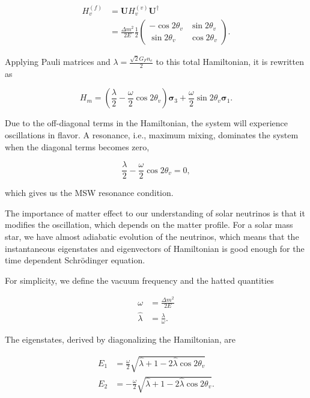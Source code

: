 \documentclass[%
 aip,
 jmp,%
 amsmath,amssymb,
 reprint,%
]{revtex4-1}
\begin{document}
\begin{align}
H_v^{(f)}& = \mathbf{U} H_v^{(v)}\mathbf{U^\dagger} \\
&= \frac{ \Delta m^2 }{2E}\frac{1}{2}\begin{pmatrix} -\cos 2\theta_v & \sin 2 \theta_v \\ \sin 2\theta_v & \cos 2\theta_v  \end{pmatrix}.
\end{align}

Applying Pauli matrices and $\lambda = \frac{\sqrt{2}G_F n_e}{2}$ to this total Hamiltonian, it is rewritten as

\begin{equation}
H_m = \left(\frac{\lambda}{2} -\frac{ \omega }{2} \cos 2\theta_v \right) \boldsymbol{\sigma}_3  + \frac{ \omega }{2} \sin 2\theta_v \boldsymbol{\sigma}_1.
\end{equation}

Due to the off-diagonal terms in the Hamiltonian, the system will experience oscillations in flavor. A resonance, i.e., maximum mixing, dominates the system when the diagonal terms becomes zero,

\begin{equation}
\frac{\lambda}{2} -\frac{ \omega }{2} \cos 2\theta_v  = 0,
\end{equation}

which gives us the MSW resonance condition.

The importance of matter effect to our understanding of solar neutrinos is that it modifies the oscillation, which depends on the matter profile. For a solar mass star, we have almost adiabatic evolution of the neutrinos, which means that the instantaneous eigenstates and eigenvectors of Hamiltonian is good enough for the time dependent Schr\"{o}dinger equation. 


For simplicity, we define the vacuum frequency and the hatted quantities

\begin{align}
\omega &= \frac{\Delta m^2}{2E} \\
\hat\lambda & = \frac{\lambda}{\omega}.
\end{align}

The eigenstates, derived by diagonalizing the Hamiltonian, are

\begin{align}
E_1 &= \frac{\omega}{2}\sqrt{ \hat\lambda +1 -  2\hat\lambda \cos 2\theta_v }\\
E_2 &= -\frac{\omega}{2}\sqrt{ \hat\lambda +1 -  2\hat\lambda \cos 2\theta_v }.
\end{align}
\end{document}
